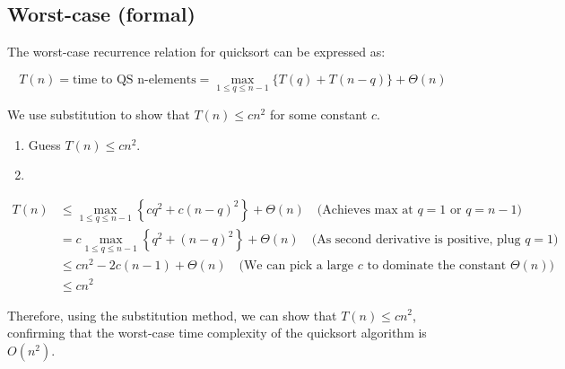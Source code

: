 \subsection{Worst-case (formal)}
    \begin{definition}
        The worst-case recurrence relation for quicksort can be expressed as:

        \[
        T(n) = \text{time to QS n-elements} = \max_{1 \leq q \leq n-1} \{ T(q) + T(n-q) \} + \Theta(n)
        \]

        \begin{center}
        \end{center}

        \noindent We use substitution to show that \( T(n) \leq cn^2 \) for some constant \( c \).
        \begin{enumerate}
            \item Guess \( T(n) \leq cn^2 \).
            \item 
        \end{enumerate}
        \begin{align*}
            T(n) &\leq \max_{1 \leq q \leq n-1} \left\{ cq^2 + c(n-q)^2 \right\} + \Theta(n) \quad \text{(Achieves max at } q = 1 \text{ or } q = n-1 \text{)} \\
                 &= c \max_{1 \leq q \leq n-1} \left\{ q^2 + (n-q)^2 \right\} + \Theta(n) \quad \text{(As second derivative is positive, plug } q = 1 \text{)} \\
                 &\leq cn^2 - 2c(n-1) + \Theta(n) \quad \text{(We can pick a large } c \text{ to dominate the constant } \Theta(n)) \\
                 &\leq cn^2
        \end{align*}

        \noindent Therefore, using the substitution method, we can show that \( T(n) \leq cn^2 \), confirming that the worst-case time complexity of the quicksort algorithm is \( O(n^2) \).
    \end{definition}

